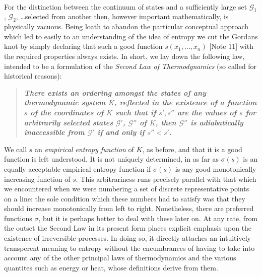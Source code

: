 \documentclass{article}
\theoremstyle{definition}
\begin{document}
\\
\normalfont
For the distinction between the continuum of states and a sufficiently large set \(\mathcal{G}_1\), \(\mathcal{G}_2\), \ldots selected from another then, however important mathematically, is physically vacuous. Being loath to abandon the particular conceptual approach which led to easily to an understanding of the idea of entropy we cut the Gordans knot by simply declaring that such a good function \(s(x_1,\ldots,x_n)\) [Note 11] with the required properties always exists. In short, we lay down the following law, intended to be a formulation of the \textit{Second Law of Thermodynamics} (so called for historical reasons):

\begin{quote}
\textbf{\textit{There exists an ordering amongst the states of any thermodynamic system \(K\), reflected in the existence of a function \(s\) of the coordinates of \(K\) such that if \(s',s''\) are the values of \(s\) for arbitrarily selected states \(\mathcal{G}'\), \(\mathcal{G}''\) of \(K\), then \(\mathcal{G}''\) is adiabatically inaccessible from \(\mathcal{G}'\) if and only if \(s''<s'\).}}
\end{quote}

We call \(s\) an \textit{empirical entropy function} of \(K\), as before, and that it is a good function is left understood. It is not uniquely determined, in as far as \(\sigma(s)\) is an equally acceptable empirical entropy function if \(\sigma(s)\) is any good monotonically increasing function of \(s\). This arbitrariness runs precisely parallel with that which we encountered when we were numbering a set of discrete representative points on a line: the sole condition which these numbers had to satisfy was that they should increase monotonically from left to right. Nonetheless, there are preferred functions \(\sigma\), but it is perhaps better to deal with these later on. At any rate, from the outset the Second Law in its present form places explicit emphasis upon the existence of irreversible processes. In doing so, it directly attaches an intuitively transperent meaning to entropy without the encumbrances of having to take into account any of the other principal laws of thermodynamics and the various quantites such as energy or heat, whose definitions derive from them.
\end{document}
